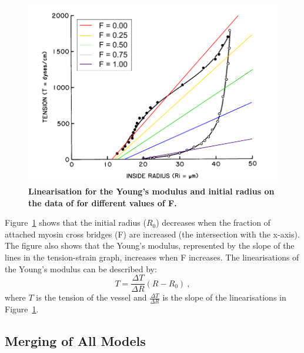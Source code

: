 \begin{figure}[h!]
  \centering
  \includegraphics[width = 12 cm]{pics/LinearisationRadius.pdf}
  \caption{\textbf{Linearisation for the Young's modulus and initial radius on the data of \citet{Gore} for different values of F.}}
  \label{fig:LinearisationRadius}
\end{figure}

Figure~\ref{fig:LinearisationRadius} shows that the initial radius ($R_0$) decreases when the fraction of attached myosin cross bridges (F) are increased (the intersection with the x-axis). The figure also shows that the Young's modulus, represented by the slope of the lines in the tension-strain graph, increases when F increases. The linearisations of the Young's modulus can be described by:
\begin{equation} \label{eq:Fbalans4}
T=\frac{\Delta T}{\Delta R}(R-R_0)~,
\end{equation}
where $T$ is the tension of the vessel and $\frac{\Delta T}{\Delta R}$ is the slope of the linearisations in Figure~\ref{fig:LinearisationRadius}. \\

\newpage
\subsection{Merging of All Models}

